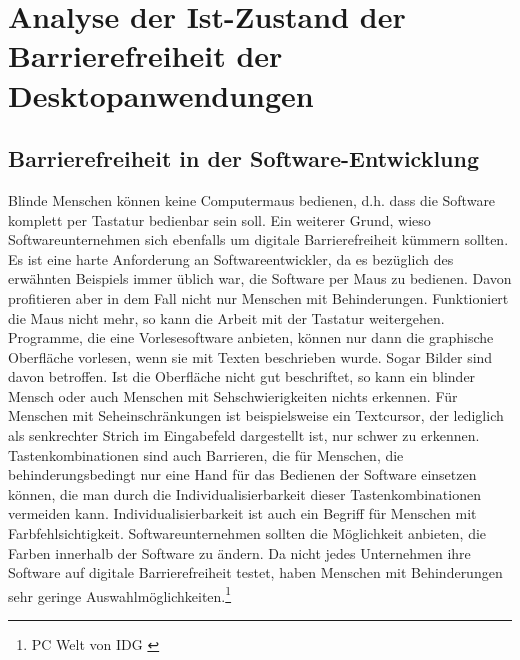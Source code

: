 \section{Analyse der Ist-Zustand der Barrierefreiheit der Desktopanwendungen}

\subsection{Barrierefreiheit in der Software-Entwicklung}
Blinde Menschen können keine Computermaus bedienen, d.h. dass die Software komplett per Tastatur bedienbar sein soll. Ein weiterer Grund, wieso Softwareunternehmen sich ebenfalls um digitale Barrierefreiheit kümmern sollten. Es ist eine harte Anforderung an Softwareentwickler, da es bezüglich des erwähnten Beispiels immer üblich war, die Software per Maus zu bedienen. Davon profitieren aber in dem Fall nicht nur Menschen mit Behinderungen. Funktioniert die Maus nicht mehr, so kann die Arbeit mit der Tastatur weitergehen. Programme, die eine Vorlesesoftware anbieten, können nur dann die graphische Oberfläche vorlesen, wenn sie mit Texten beschrieben wurde. Sogar Bilder sind davon betroffen. Ist die Oberfläche nicht gut beschriftet, so kann ein blinder Mensch oder auch Menschen mit Sehschwierigkeiten nichts erkennen. Für Menschen mit Seheinschränkungen ist beispielsweise ein Textcursor, der lediglich als senkrechter Strich im Eingabefeld dargestellt ist, nur schwer zu erkennen. Tastenkombinationen sind auch Barrieren, die für Menschen, die behinderungsbedingt nur eine Hand für das Bedienen der Software einsetzen können, die man durch die Individualisierbarkeit dieser Tastenkombinationen vermeiden kann. Individualisierbarkeit ist auch ein Begriff für Menschen mit Farbfehlsichtigkeit. Softwareunternehmen sollten die Möglichkeit anbieten, die Farben innerhalb der Software zu ändern. Da nicht jedes Unternehmen ihre Software auf digitale Barrierefreiheit testet, haben Menschen mit Behinderungen sehr geringe Auswahlmöglichkeiten.\footnote{PC Welt von IDG \cite{PcWelt}}

